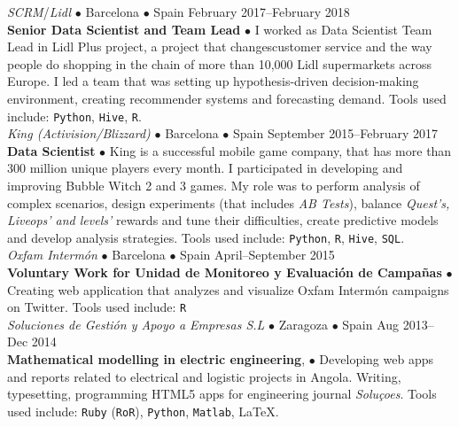 \documentclass[a4paper, oneside]{scrreprt}
\begin{document}
\vspace{-0.3cm}
\noindent{}\textit{SCRM}/\textit{Lidl} $\bullet$ 
Barcelona $\bullet$ Spain \hfill February 2017--February 2018\\
\noindent\textbf{\small Senior Data Scientist and Team Lead} $\bullet$ 
{\small  I worked as Data Scientist Team Lead in Lidl Plus project, a project that
  changescustomer service and the way people do shopping in the chain of more
  than 10,000 Lidl supermarkets across Europe. I led a team that was
  setting up hypothesis-driven decision-making environment, creating recommender
  systems and forecasting demand. Tools used include: \texttt{Python}, \texttt{Hive}, \texttt{R}.
}\\

\vspace{-0.3cm}
\noindent{}
\hspace{-0.15cm}\textit{King (Activision/Blizzard)} $\bullet$ 
Barcelona $\bullet$ Spain \hfill September 2015--February 2017\\
\noindent\textbf{\small Data Scientist } $\bullet$ 
{\small King is a successful mobile game company, that has more
  than 300 million unique players every month. I participated in developing and
  improving Bubble Witch 2 and 3 games. My
  role was to perform analysis of complex scenarios,
  design experiments (that includes \textit{AB Tests}),
  balance \textit{Quest's, Liveops' and levels'}
  rewards and tune their difficulties,
  create predictive models and develop analysis strategies.
  Tools used include: \texttt{Python}, \texttt{R}, \texttt{Hive}, \texttt{SQL}. }\\

\vspace{-0.3cm}
\noindent{}\textit{Oxfam Intermón} $\bullet$ 
Barcelona $\bullet$ Spain \hfill April--September 2015\\
\noindent\textbf{\small Voluntary Work for Unidad de Monitoreo y Evaluación de Campañas} $\bullet$ 
{\small Creating web application that analyzes and visualize Oxfam Intermón
  campaigns on Twitter.  Tools used
  include: \texttt{R}}\\

\vspace{-0.3cm}
\noindent{}\textit{Soluciones de Gestión y Apoyo a Empresas S.L} 
$\bullet$ Zaragoza $\bullet$ Spain \hfill Aug 2013--Dec 2014\\
\noindent\textbf{\small Mathematical modelling in electric engineering}, $\bullet$ 
{\small Developing web apps and reports related to electrical and
  logistic projects in Angola.  Writing, typesetting, programming
  HTML5 apps for engineering journal \emph{Soluçoes}.  Tools used
  include:
  \texttt{Ruby} (\texttt{RoR}), \texttt{Python}, \texttt{Matlab}, \LaTeX.}\\
\end{document}
